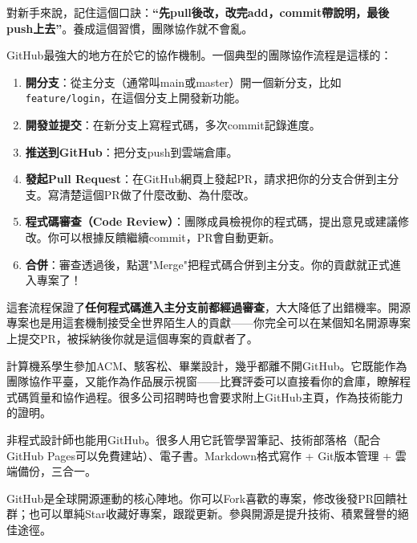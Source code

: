 對新手來說，記住這個口訣：\textbf{“先pull後改，改完add，commit帶說明，最後push上去”}。養成這個習慣，團隊協作就不會亂。


GitHub最強大的地方在於它的協作機制。一個典型的團隊協作流程是這樣的：

\begin{enumerate}
  \item \textbf{開分支}：從主分支（通常叫main或master）開一個新分支，比如\texttt{feature/\allowbreak login}，在這個分支上開發新功能。
  \item \textbf{開發並提交}：在新分支上寫程式碼，多次commit記錄進度。
  \item \textbf{推送到GitHub}：把分支push到雲端倉庫。
  \item \textbf{發起Pull Request}：在GitHub網頁上發起PR，請求把你的分支合併到主分支。寫清楚這個PR做了什麼改動、為什麼改。
  \item \textbf{程式碼審查（Code Review）}：團隊成員檢視你的程式碼，提出意見或建議修改。你可以根據反饋繼續commit，PR會自動更新。
  \item \textbf{合併}：審查透過後，點選"Merge"把程式碼合併到主分支。你的貢獻就正式進入專案了！
\end{enumerate}

這套流程保證了\textbf{任何程式碼進入主分支前都經過審查}，大大降低了出錯機率。開源專案也是用這套機制接受全世界陌生人的貢獻——你完全可以在某個知名開源專案上提交PR，被採納後你就是這個專案的貢獻者了。



計算機系學生參加ACM、駭客松、畢業設計，幾乎都離不開GitHub。它既能作為團隊協作平臺，又能作為作品展示視窗——比賽評委可以直接看你的倉庫，瞭解程式碼質量和協作過程。很多公司招聘時也會要求附上GitHub主頁，作為技術能力的證明。


非程式設計師也能用GitHub。很多人用它託管學習筆記、技術部落格（配合GitHub Pages可以免費建站）、電子書。Markdown格式寫作 + Git版本管理 + 雲端備份，三合一。


GitHub是全球開源運動的核心陣地。你可以Fork喜歡的專案，修改後發PR回饋社群；也可以單純Star收藏好專案，跟蹤更新。參與開源是提升技術、積累聲譽的絕佳途徑。



